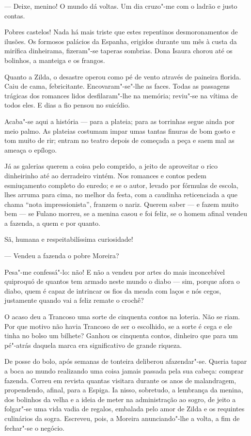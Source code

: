 --- Deixe, menino! O mundo dá voltas. Um dia cruzo"-me com o ladrão e
justo contas.

Pobres castelos! Nada há mais triste que estes repentinos
desmoronamentos de ilusões. Os formosos palácios da Espanha, erigidos
durante um mês à custa da mirífica dinheirama, fizeram"-se taperas
sombrias. Dona Isaura chorou até os bolinhos, a manteiga e os frangos.

Quanto a Zilda, o desastre operou como pé de vento através de paineira
florida. Caiu de cama, febricitante. Encovaram"-se"-lhe as faces. Todas as
passagens trágicas dos romances lidos desfilaram"-lhe na memória;
reviu"-se na vítima de todos eles. E dias a fio pensou no suicídio.


Acaba"-se aqui a história --- para a plateia; para as torrinhas segue
ainda por meio palmo. As plateias costumam impar umas tantas finuras de
bom gosto e tom muito de rir; entram no teatro depois de começada a peça
e saem mal as ameaça o epílogo.

Já as galerias querem a coisa pelo comprido, a jeito de aproveitar o
rico dinheirinho até ao derradeiro vintém. Nos romances e contos pedem
esmiuçamento completo do enredo; e se o autor, levado por fórmulas de
escola, lhes arruma para cima, no melhor da festa, com a caudinha
reticenciada a que chama ``nota impressionista'', franzem o nariz.
Querem saber --- e fazem muito bem --- se Fulano morreu, se a menina
casou e foi feliz, se o homem afinal vendeu a fazenda, a quem e por
quanto.

Sã, humana e respeitabilíssima curiosidade!

--- Vendeu a fazenda o pobre Moreira?

Pesa"-me confessá"-lo: não! E não a vendeu por artes do mais inconcebível
quiproquó de quantos tem armado neste mundo o diabo --- sim, porque
afora o diabo, quem é capaz de intrincar os fios da meada com laços e
nós cegos, justamente quando vai a feliz remate o crochê?

O acaso deu a Trancoso uma sorte de cinquenta contos na loteria. Não se
riam. Por que motivo não havia Trancoso de ser o escolhido, se a sorte é
cega e ele tinha no bolso um bilhete? Ganhou os cinquenta contos,
dinheiro que para um pé"-atrás daquela marca era significativo de grande
riqueza.

De posse do bolo, após semanas de tonteira deliberou afazendar"-se.
Queria tapar a boca ao mundo realizando uma coisa jamais passada pela
sua cabeça: comprar fazenda. Correu em revista quantas visitara durante
os anos de malandragem, propendendo, afinal, para a Espiga. Ia nisso,
sobretudo, a lembrança da menina, dos bolinhos da velha e a ideia de
meter na administração ao sogro, de jeito a folgar"-se uma vida vadia de
regalos, embalada pelo amor de Zilda e os requintes culinários da sogra.
Escreveu, pois, a Moreira anunciando"-lhe a volta, a fim de fechar"-se o
negócio.

